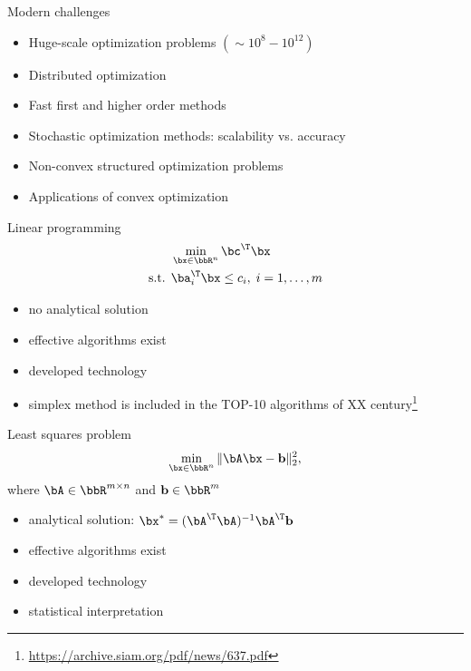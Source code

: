 \documentclass[12pt]{beamer}
\begin{document}
\begin{frame}{Modern challenges}
\begin{itemize}
\item Huge-scale optimization problems $(\sim 10^8-10^{12})$
\item Distributed optimization 
\item Fast first and higher order methods 
\item Stochastic optimization methods: scalability vs. accuracy
\item Non-convex structured optimization problems
\item Applications of convex optimization 
\end{itemize}
\end{frame}

\begin{frame}{Linear programming}
\begin{equation*}
\begin{split}
&\min\limits_{\bx \in \bbR^n} \bc^{\T}\bx\\
\text{s.t. } & \ba^{\T}_i \bx \leq c_i, \; i = 1,\ldots, m
\end{split}
\label{eq::lin_prog}
\end{equation*}
\begin{itemize}
\item no analytical solution
\item effective algorithms exist
\item developed technology
\item simplex method is  included in the TOP-10 algorithms of XX century\footnote{\url{https://archive.siam.org/pdf/news/637.pdf}}
\end{itemize}
\end{frame}

\begin{frame}{Least squares problem}
\begin{equation*}
\min\limits_{\bx \in \bbR^n} \|\bA\bx - \mathbf{b} \|^2_2,
\label{eq::least_sq}
\end{equation*}
where $\bA \in \bbR^{m \times n}$ and $\mathbf{b} \in \bbR^m$
\begin{itemize}
\item analytical solution: $\bx^* = (\bA^{\T}\bA)^{-1}\bA^{\T}\mathbf{b}$
\item effective algorithms exist
\item developed technology
\item statistical interpretation
\end{itemize}
\end{frame}
\end{document}
